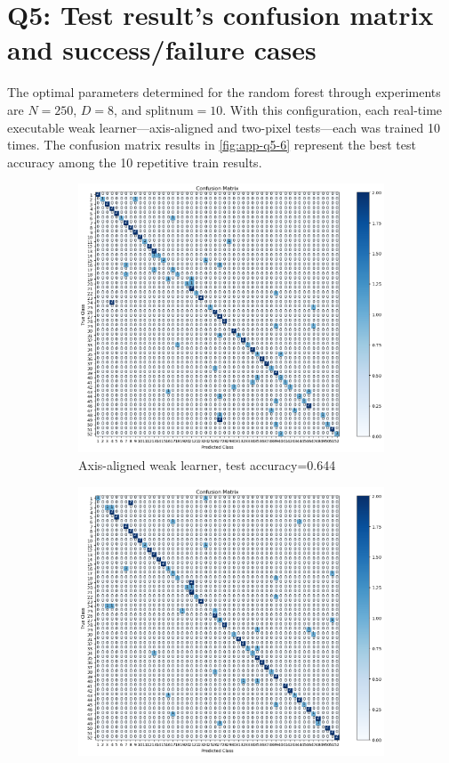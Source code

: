 \section{Q5: Test result's confusion matrix and success/failure cases }
\label{subsec:Q5-1}
The optimal parameters determined for the random forest through experiments are $N=250$, $D=8$, and $\text{splitnum}=10$. With this configuration, each real-time executable weak learner—axis-aligned and two-pixel tests—each was trained 10 times. The confusion matrix results in \cref{fig:app-q5-6} represent the best test accuracy among the 10 repetitive train results.

\begin{figure}[htbp]
	\centering
	\begin{subfigure}[t]{0.4\linewidth}
		\centering
		\includegraphics[width=\linewidth]{image/q5-fig6.png}
		\caption{Axis-aligned weak learner, test accuracy=0.644}
		\label{fig:q5-fig6}
	\end{subfigure}%
	\quad
	\begin{subfigure}[t]{0.4\linewidth}
		\centering
		\includegraphics[width=\linewidth]{image/q5-fig8.png}

\end{subfigure}
\end{figure}
